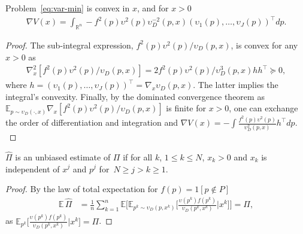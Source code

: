\begin{theorem}\label{thm:var-convexity}
Problem~\eqref{eq:var-min} is convex in $x$, and for $x > 0$
\begin{align*}
    \nabla V(x) = \int_{\mathbb{R}^n} - f^2 (p)\upsilon^2(p)\upsilon_D^{-2}(p,x) (\upsilon_1(p), \dots, \upsilon_J(p))^\top dp.
\end{align*} 
\end{theorem}
\begin{proof}
The sub-integral expression, $f^2(p)\upsilon^2(p)/\upsilon_D(p,x)$, is convex for any $x > 0$ as
\begin{align*}
    \nabla^2_x \left[f^2(p)\upsilon^2(p)/\upsilon_D(p,x)\right] = 2f^2(p)\upsilon^2(p)/\upsilon^3_D(p,x) h h^\top \!\succeq\! 0,
\end{align*}
where $h = (\upsilon_1(p), \dots, \upsilon_J(p))^\top = \nabla_x \upsilon_D(p,x)$. 
The latter implies the integral's convexity. %
Finally, by the dominated convergence theorem as $\mathbb{E}_{p \sim \upsilon_D(\cdot,x)} \nabla_x\left[f^2(p)\upsilon^2(p)/\upsilon_D(p,x)\right]$ is finite for $x>0$, one can exchange the order of differentiation and integration and 
$\nabla V(x) = -\int \frac{f^2 (p)\upsilon^2(p)}{\upsilon_D^2(p,x)} h^\top dp.$
\end{proof}


\begin{theorem}\label{thm:unbias}
$\hat \Pi$ is an unbiased estimate of $\Pi$ if for all $k$, $1\le k \le N$, $x_k > 0$ and $x_k$ is independent of $x^j$ and $p^j$ for~$N\ge j > k\ge 1$.
\end{theorem}
\begin{proof} 
By the law of total expectation for $f(p) \!=\! 1[p\!\not\in\! P]$
\begin{align*}
    \mathbb{E}\, {\hat\Pi} & = \frac{1}{n}\sum_{k=1}^n  \mathbb{E}\biggl[\mathbb{E}_{p^k\sim\upsilon_D(p, x^k)} \biggl[ \frac{\upsilon(p^k) f(p^k)}{\upsilon_D(p^k,x^k)}\big| x^k\biggr]\biggr] = \Pi, %
\end{align*}
as $\mathbb{E}_{p^k} \bigl[ \frac{\upsilon(p^k)f(p^k)}{\upsilon_D(p^k,x^k)}\big| x^k\bigr] = \Pi$. %
\end{proof}


